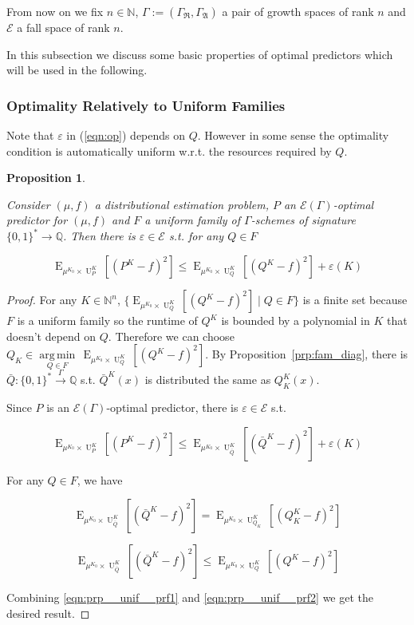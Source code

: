 \documentclass{article}
\numberwithin{equation}{section}
\theoremstyle{definition}
\theoremstyle{plain}
\newtheorem{proposition}{Proposition}[section]
\newcommand{\Bool}{\{0,1\}}
\newcommand{\Words}{{\Bool^*}}
\DeclareMathOperator{\E}{E}
\DeclareMathOperator{\Un}{U}
\newcommand{\Argmin}[1]{\underset{#1}{\operatorname{arg\,min}}\,}
\newcommand{\Nats}{\mathbb{N}}
\newcommand{\Rats}{\mathbb{Q}}
\newcommand{\GrowR}{\Gamma_{\mathfrak{R}}}
\newcommand{\GrowA}{\Gamma_{\mathfrak{A}}}
\newcommand{\Grow}{\Gamma:=(\GrowR,\GrowA)}
\newcommand{\Fall}{\mathcal{E}}
\newcommand{\EG}{\Fall(\Gamma)}
\newcommand{\Scheme}{\xrightarrow{\Gamma}}
\begin{document}
From now on we fix $n \in \Nats$, $\Grow$ a pair of growth spaces of rank $n$ and $\Fall$ a fall space of rank $n$.

In this subsection we discuss some basic properties of optimal predictors which will be used in the following.

\subsubsection{Optimality Relatively to Uniform Families}

Note that $\varepsilon$ in (\ref{eqn:op}) depends on $Q$. However in some sense the optimality condition is automatically uniform w.r.t. the resources required by $Q$.

\begin{proposition}
\label{prp:unif}

Consider $(\mu,f)$ a distributional estimation problem, $P$ an $\EG$-optimal predictor for $(\mu,f)$ and $F$ a uniform family of $\Gamma$-schemes of signature $\Words \rightarrow \Rats$. Then there is $\varepsilon \in \Fall$ s.t. for any $Q \in F$

\begin{equation}
\E_{\mu^{K_0} \times \Un_P^{K}}[(P^{K} - f)^2] \leq \E_{\mu^{K_0} \times \Un_Q^{K}}[(Q^{K} - f)^2] + \varepsilon(K)
\end{equation}

\end{proposition}

\begin{proof}

For any $K \in \Nats^n$, $\{\E_{\mu^{K_0} \times \Un_Q^{K}}[(Q^{K} - f)^2] \mid Q \in F\}$ is a finite set because $F$ is a uniform family so the runtime of $Q^{K}$ is bounded by a polynomial in $K$ that doesn't depend on $Q$. Therefore we can choose ${Q_{K} \in \Argmin{Q \in F} \E_{\mu^{K_0} \times \Un_Q^{K}}[(Q^{K} - f)^2]}$. By Proposition~\ref{prp:fam_diag}, there is $\bar{Q}: \Words \Scheme \Rats$ s.t. $\bar{Q}^{K}(x)$ is distributed the same as $Q_{K}^{K}(x)$.

Since $P$ is an $\EG$-optimal predictor, there is $\varepsilon \in \Fall$ s.t.

\begin{equation}
\label{eqn:prp__unif__prf1}
\E_{\mu^{K_0} \times \Un_P^{K}}[(P^{K} - f)^2] \leq \E_{\mu^{K_0} \times \Un_{\bar{Q}}^{K}}[(\bar{Q}^{K} - f)^2] + \varepsilon(K)
\end{equation}

For any $Q \in F$, we have 

$$\E_{\mu^{K_0} \times \Un_{\bar{Q}}^{K}}[(\bar{Q}^{K} - f)^2]=\E_{\mu^{K_0} \times \Un_{Q_{K}}^{K}}[(Q_{K}^{K} - f)^2]$$

\begin{equation}
\label{eqn:prp__unif__prf2}
\E_{\mu^{K_0} \times \Un_{\bar{Q}}^{K}}[(\bar{Q}^{K} - f)^2] \leq \E_{\mu^{K_0} \times \Un_Q^{K}}[(Q^{K} - f)^2]
\end{equation}

Combining \ref{eqn:prp__unif__prf1} and \ref{eqn:prp__unif__prf2} we get the desired result.
\end{proof}
\end{document}
